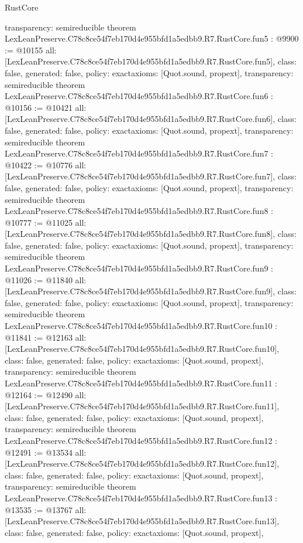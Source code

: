 \begin{lexlean}{RustCore}
\begin{coremodule}
{  transparency: semireducible
}
theorem LexLeanPreserve.C78c8ce54f7eb170d4e955bfd1a5edbb9.R7.RustCore.fun5 : @9900 := @10155 {
  all: [LexLeanPreserve.C78c8ce54f7eb170d4e955bfd1a5edbb9.R7.RustCore.fun5],
  class: false,
  generated: false,
  policy: exact{axioms: [Quot.sound, propext]},
  transparency: semireducible
}
theorem LexLeanPreserve.C78c8ce54f7eb170d4e955bfd1a5edbb9.R7.RustCore.fun6 : @10156 := @10421 {
  all: [LexLeanPreserve.C78c8ce54f7eb170d4e955bfd1a5edbb9.R7.RustCore.fun6],
  class: false,
  generated: false,
  policy: exact{axioms: [Quot.sound, propext]},
  transparency: semireducible
}
theorem LexLeanPreserve.C78c8ce54f7eb170d4e955bfd1a5edbb9.R7.RustCore.fun7 : @10422 := @10776 {
  all: [LexLeanPreserve.C78c8ce54f7eb170d4e955bfd1a5edbb9.R7.RustCore.fun7],
  class: false,
  generated: false,
  policy: exact{axioms: [Quot.sound, propext]},
  transparency: semireducible
}
theorem LexLeanPreserve.C78c8ce54f7eb170d4e955bfd1a5edbb9.R7.RustCore.fun8 : @10777 := @11025 {
  all: [LexLeanPreserve.C78c8ce54f7eb170d4e955bfd1a5edbb9.R7.RustCore.fun8],
  class: false,
  generated: false,
  policy: exact{axioms: [Quot.sound, propext]},
  transparency: semireducible
}
theorem LexLeanPreserve.C78c8ce54f7eb170d4e955bfd1a5edbb9.R7.RustCore.fun9 : @11026 := @11840 {
  all: [LexLeanPreserve.C78c8ce54f7eb170d4e955bfd1a5edbb9.R7.RustCore.fun9],
  class: false,
  generated: false,
  policy: exact{axioms: [Quot.sound, propext]},
  transparency: semireducible
}
theorem LexLeanPreserve.C78c8ce54f7eb170d4e955bfd1a5edbb9.R7.RustCore.fun10 : @11841 := @12163 {
  all: [LexLeanPreserve.C78c8ce54f7eb170d4e955bfd1a5edbb9.R7.RustCore.fun10],
  class: false,
  generated: false,
  policy: exact{axioms: [Quot.sound, propext]},
  transparency: semireducible
}
theorem LexLeanPreserve.C78c8ce54f7eb170d4e955bfd1a5edbb9.R7.RustCore.fun11 : @12164 := @12490 {
  all: [LexLeanPreserve.C78c8ce54f7eb170d4e955bfd1a5edbb9.R7.RustCore.fun11],
  class: false,
  generated: false,
  policy: exact{axioms: [Quot.sound, propext]},
  transparency: semireducible
}
theorem LexLeanPreserve.C78c8ce54f7eb170d4e955bfd1a5edbb9.R7.RustCore.fun12 : @12491 := @13534 {
  all: [LexLeanPreserve.C78c8ce54f7eb170d4e955bfd1a5edbb9.R7.RustCore.fun12],
  class: false,
  generated: false,
  policy: exact{axioms: [Quot.sound, propext]},
  transparency: semireducible
}
theorem LexLeanPreserve.C78c8ce54f7eb170d4e955bfd1a5edbb9.R7.RustCore.fun13 : @13535 := @13767 {
  all: [LexLeanPreserve.C78c8ce54f7eb170d4e955bfd1a5edbb9.R7.RustCore.fun13],
  class: false,
  generated: false,
  policy: exact{axioms: [Quot.sound, propext]},
}
\end{coremodule}
\end{lexlean}
